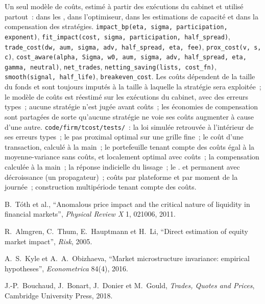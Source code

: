 \begin{build}
 Un seul modèle de coûts, estimé à partir des exécutions du cabinet et utilisé partout~: dans les , dans l'optimiseur, dans les estimations de capacité et dans la compensation
des stratégies.
 \texttt{impact\_bp(eta, sigma, participation, exponent)}, \texttt{fit\_impact(cost, sigma, participation, half\_spread)},
\texttt{trade\_cost(dw, aum, sigma, adv, half\_spread, eta, fee)}, \texttt{prox\_cost(v, s, c)},
\texttt{cost\_aware(alpha, Sigma, w0, aum, sigma, adv, half\_spread, eta, gamma, neutral)}, \texttt{net\_trades}, \texttt{netting\_saving(lists, cost\_fn)}, \texttt{smooth(signal, half\_life)}, \texttt{breakeven\_cost}.
 Les coûts dépendent de la taille du fonds et sont toujours imputés à la taille à laquelle la stratégie sera exploitée~; le modèle de coûts est réestimé sur les exécutions du cabinet, avec des erreurs
types~; aucune stratégie n'est jugée avant coûts~; les économies de compensation sont partagées de sorte qu'aucune stratégie ne voie ses coûts augmenter à cause d'une autre.
 \texttt{code/firm/tcost/tests/}~: la loi simulée retrouvée à l'intérieur de ses erreurs types~; le pas proximal optimal sur une grille fine~; le coût d'une
transaction, calculé à la main~; le portefeuille tenant compte des coûts égal à la moyenne-variance sans coûts, et localement optimal avec coûts~; la compensation calculée à la main~; la réponse indicielle du lissage~; le .
  et permanent avec décroissance (un propagateur)~; coûts par plateforme et par moment de la journée~; construction multipériode tenant compte des coûts.
\end{build}

\begin{omsources}
\item B.~Tóth et al., ``Anomalous price impact and the critical nature of liquidity in financial markets'', \emph{Physical Review X} 1, 021006, 2011.
\item R.~Almgren, C.~Thum, E.~Hauptmann et H.~Li, ``Direct estimation of equity market impact'', \emph{Risk}, 2005.
\item A.~S.~Kyle et A.~A.~Obizhaeva, ``Market microstructure invariance: empirical hypotheses'', \emph{Econometrica} 84(4), 2016.
\item J.-P.~Bouchaud, J.~Bonart, J.~Donier et M.~Gould, \emph{Trades, Quotes and Prices}, Cambridge University Press, 2018.
\end{omsources}

